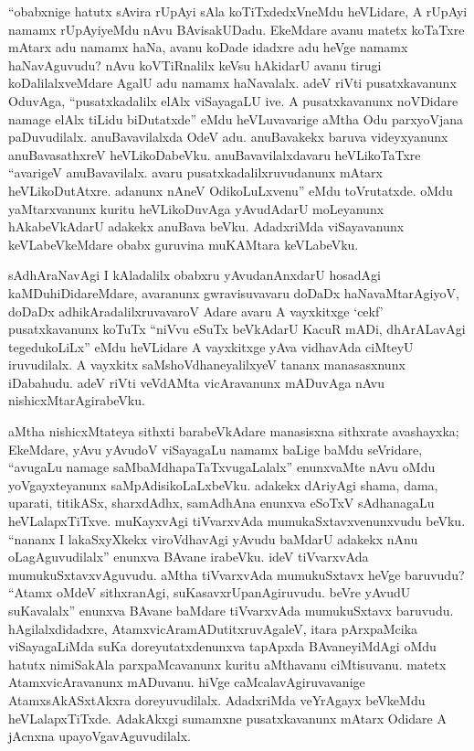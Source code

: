 ``obabxnige hatutx sAvira rUpAyi sAla koTiTxdedxVneMdu heVLidare, A rUpAyi namamx rUpAyiyeMdu nAvu BAvisakUDadu. EkeMdare avanu matetx koTaTxre mAtarx adu namamx haNa, avanu koDade idadxre adu heVge namamx haNavAguvudu? nAvu koVTiRnalilx keVsu hAkidarU avanu tirugi koDalilalxveMdare AgalU adu namamx haNavalalx. adeV riVti pusatxkavanunx OduvAga, ``pusatxkadalilx elAlx viSayagaLU ive. A pusatxkavanunx noVDidare namage elAlx tiLidu biDutatxde'' eMdu heVLuvavarige aMtha Odu parxyoVjana paDuvudilalx. anuBavavilalxda OdeV adu. anuBavakekx baruva videyxyanunx anuBavasathxreV heVLikoDabeVku. anuBavavilalxdavaru heVLikoTaTxre ``avarigeV anuBavavilalx. avaru pusatxkadalilxruvudanunx mAtarx heVLikoDutAtxre. adanunx nAneV OdikoLuLxvenu'' eMdu toVrutatxde. oMdu yaMtarxvanunx kuritu heVLikoDuvAga yAvudAdarU moLeyanunx hAkabeVkAdarU adakekx anuBava beVku. AdadxriMda viSayavanunx keVLabeVkeMdare obabx guruvina muKAMtara keVLabeVku.

sAdhAraNavAgi I kAladalilx obabxru yAvudanAnxdarU hosadAgi kaMDuhiDidareMdare, avaranunx gwravisuvavaru doDaDx haNavaMtarAgiyoV, doDaDx adhikAradalilxruvavaroV Adare avaru A vayxkitxge `cekf' pusatxkavanunx koTuTx ``niVvu eSuTx beVkAdarU KacuR mADi, dhArALavAgi tegedukoLiLx'' eMdu heVLidare A vayxkitxge yAva vidhavAda ciMteyU iruvudilalx. A vayxkitx saMshoVdhaneyalilxyeV tananx manasasxnunx iDabahudu. adeV riVti veVdAMta vicAravanunx mADuvAga nAvu nishicxMtarAgirabeVku.

aMtha nishicxMtateya sithxti barabeVkAdare manasisxna sithxrate avashayxka; EkeMdare, yAvu yAvudoV viSayagaLu namamx baLige baMdu seVridare, ``avugaLu namage saMbaMdhapaTaTxvugaLalalx'' enunxvaMte nAvu oMdu yoVgayxteyanunx saMpAdisikoLaLxbeVku. adakekx dAriyAgi shama, dama, uparati, titikASx, sharxdAdhx, samAdhAna enunxva eSoTxV sAdhanagaLu heVLalapxTiTxve. muKayxvAgi tiVvarxvAda mumukaSxtavxvenunxvudu beVku. ``nananx I lakaSxyXkekx viroVdhavAgi yAvudu baMdarU adakekx nAnu oLagAguvudilalx'' enunxva BAvane irabeVku. ideV tiVvarxvAda mumukuSxtavxvAguvudu. aMtha tiVvarxvAda mumukuSxtavx heVge baruvudu? ``Atamx oMdeV sithxranAgi, suKasavxrUpanAgiruvudu. beVre yAvudU suKavalalx'' enunxva BAvane baMdare tiVvarxvAda mumukuSxtavx baruvudu. hAgilalxdidadxre, AtamxvicAramADutitxruvAgaleV, itara pArxpaMcika viSayagaLiMda suKa doreyutatxdenunxva tapApxda BAvaneyiMdAgi oMdu hatutx nimiSakAla parxpaMcavanunx kuritu aMthavanu ciMtisuvanu. matetx AtamxvicAravanunx mADuvanu. hiVge caMcalavAgiruvavanige AtamxsAkASxtAkxra doreyuvudilalx. AdadxriMda veYrAgayx beVkeMdu heVLalapxTiTxde. AdakAkxgi sumamxne pusatxkavanunx mAtarx Odidare A jAcnxna upayoVgavAguvudilalx.

